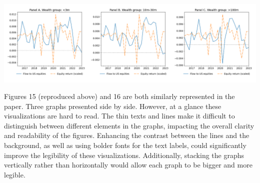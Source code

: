 \documentclass[]{article}
\begin{document}
\begin{spacing}{1.1}
	
		\begin{center}
			\includegraphics[width=\linewidth]{screenshot002}
		\end{center}
		Figures 15 (reproduced above) and 16 are both similarly represented in the paper. Three graphs presented side by side. However, at a glance these visualizations are hard to read. The thin texts and lines make it difficult to distinguish between different elements in the graphs, impacting the overall clarity and readability of the figures. Enhancing the contrast between the lines and the background, as well as using bolder fonts for the text labels, could significantly improve the legibility of these visualizations. Additionally, stacking the graphs vertically rather than horizontally would allow each graph to be bigger and more legible.
	
		


\pagebreak
\printbibliography

\end{spacing}
\end{document}
